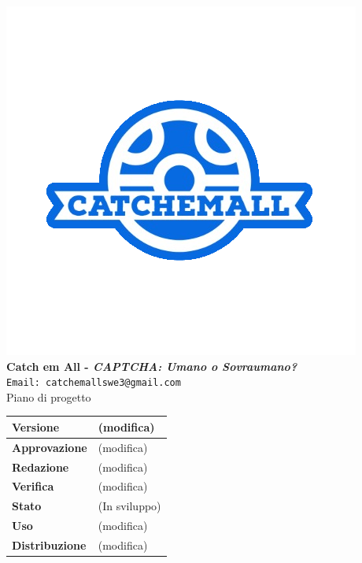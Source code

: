 \begin{titlepage}
\begin{center}
	\includegraphics[scale = 1.5]{img/logo.png}\\
	\bigskip
	\large \textbf{Catch em All - \textit{CAPTCHA: Umano o Sovraumano?}}\\
	\texttt{Email: catchemallswe3@gmail.com}\\
	\vfill
	{\fontsize{1.5cm}{0}\selectfont Piano di progetto}\\
	\vfill
	\begin{table}[h]
		\centering
		\setlength\extrarowheight{4pt}
		\begin{tabular}{| C{4.5cm} | C{4.5cm} |}
			\hline
			\textbf{Versione} & (modifica)\\
			\hline
			\textbf{Approvazione} & (modifica)\\
			\hline
			\textbf{Redazione} & (modifica)\\
			\hline
			\textbf{Verifica} & (modifica)\\
			\hline
			\textbf{Stato} & (In sviluppo)\\
			\hline
			\textbf{Uso} & (modifica)\\
			\hline
			\textbf{Distribuzione} & (modifica)\\
			\hline
		\end{tabular}\\
	\end{table}
	
\end{center}
\end{titlepage}